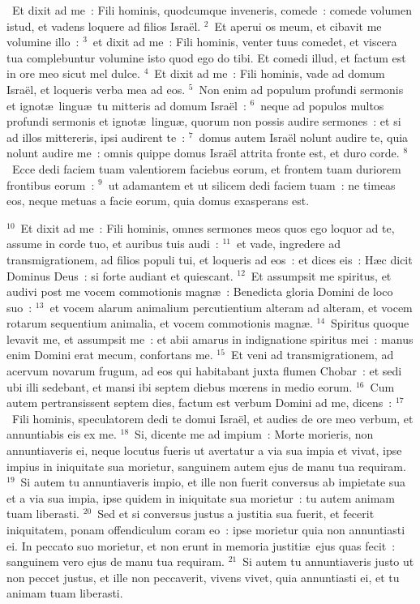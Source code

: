 ~Et dixit ad me~: Fili hominis, quodcumque inveneris, comede~: comede volumen istud, et vadens loquere ad filios Isra\"el.
${}^{2}$~Et aperui os meum, et cibavit me volumine illo~:
${}^{3}$~et dixit ad me~: Fili hominis, venter tuus comedet, et viscera tua complebuntur volumine isto quod ego do tibi. Et comedi illud, et factum est in ore meo sicut mel dulce.
${}^{4}$~Et dixit ad me~: Fili hominis, vade ad domum Isra\"el, et loqueris verba mea ad eos.
${}^{5}$~Non enim ad populum profundi sermonis et ignot\ae\ lingu\ae\ tu mitteris ad domum Isra\"el~:
${}^{6}$~neque ad populos multos profundi sermonis et ignot\ae\ lingu\ae , quorum non possis audire sermones~: et si ad illos mittereris, ipsi audirent te~:
${}^{7}$~domus autem Isra\"el nolunt audire te, quia nolunt audire me~: omnis quippe domus Isra\"el attrita fronte est, et duro corde.
${}^{8}$~Ecce dedi faciem tuam valentiorem faciebus eorum, et frontem tuam duriorem frontibus eorum~:
${}^{9}$~ut adamantem et ut silicem dedi faciem tuam~: ne timeas eos, neque metuas a facie eorum, quia domus exasperans est.


${}^{10}$~Et dixit ad me~: Fili hominis, omnes sermones meos quos ego loquor ad te, assume in corde tuo, et auribus tuis audi~:
${}^{11}$~et vade, ingredere ad transmigrationem, ad filios populi tui, et loqueris ad eos~: et dices eis~: H\ae c dicit Dominus Deus~: si forte audiant et quiescant.
${}^{12}$~Et assumpsit me spiritus, et audivi post me vocem commotionis magn\ae~: Benedicta gloria Domini de loco suo~:
${}^{13}$~et vocem alarum animalium percutientium alteram ad alteram, et vocem rotarum sequentium animalia, et vocem commotionis magn\ae .
${}^{14}$~Spiritus quoque levavit me, et assumpsit me~: et abii amarus in indignatione spiritus mei~: manus enim Domini erat mecum, confortans me.
${}^{15}$~Et veni ad transmigrationem, ad acervum novarum frugum, ad eos qui habitabant juxta flumen Chobar~: et sedi ubi illi sedebant, et mansi ibi septem diebus mœrens in medio eorum.
${}^{16}$~Cum autem pertransissent septem dies, factum est verbum Domini ad me, dicens~:
${}^{17}$~Fili hominis, speculatorem dedi te domui Isra\"el, et audies de ore meo verbum, et annuntiabis eis ex me.
${}^{18}$~Si, dicente me ad impium~: Morte morieris, non annuntiaveris ei, neque locutus fueris ut avertatur a via sua impia et vivat, ipse impius in iniquitate sua morietur, sanguinem autem ejus de manu tua requiram.
${}^{19}$~Si autem tu annuntiaveris impio, et ille non fuerit conversus ab impietate sua et a via sua impia, ipse quidem in iniquitate sua morietur~: tu autem animam tuam liberasti.
${}^{20}$~Sed et si conversus justus a justitia sua fuerit, et fecerit iniquitatem, ponam offendiculum coram eo~: ipse morietur quia non annuntiasti ei. In peccato suo morietur, et non erunt in memoria justiti\ae\ ejus quas fecit~: sanguinem vero ejus de manu tua requiram.
${}^{21}$~Si autem tu annuntiaveris justo ut non peccet justus, et ille non peccaverit, vivens vivet, quia annuntiasti ei, et tu animam tuam liberasti.


